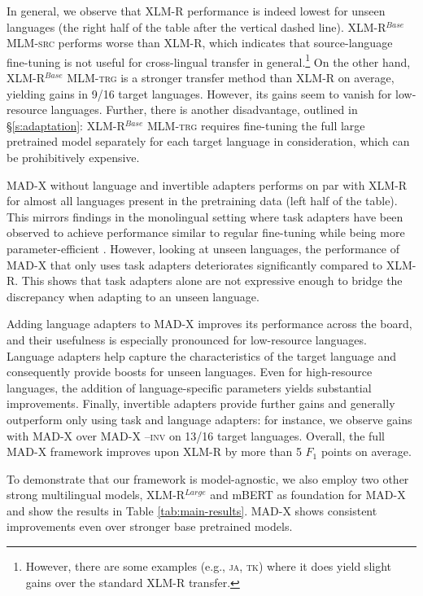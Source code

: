 \documentclass[11pt,a4paper]{article}
\newcommand{\model}[1]{\textsc{MAD-X}}
\newcommand{\xlmr}[1]{\textsc{XLM-R}}
\newcommand{\mlmsrc}[1]{\textsc{XLM-R$^{Base}$ MLM-src}}
\newcommand{\mlmtrg}[1]{\textsc{XLM-R$^{Base}$ MLM-trg}}
\begin{document}
In general, we observe that \xlmr{} performance is indeed lowest for unseen languages (the right half of the table after the vertical dashed line). \mlmsrc{} performs worse than \xlmr{}, which indicates that source-language fine-tuning is not useful for cross-lingual transfer in general.\footnote{However, there are some examples (e.g., \textsc{ja}, \textsc{tk}) where it does yield slight gains over the standard \xlmr{} transfer.} On the other hand, \mlmtrg{} is a stronger transfer method than \xlmr{} on average, yielding gains in 9/16 target languages. However, its gains seem to vanish for low-resource languages. Further, there is another disadvantage, outlined in \S\ref{s:adaptation}: \mlmtrg{} requires fine-tuning the full large pretrained model separately for each target language in consideration, which can be prohibitively expensive.

  

\model{} without language and invertible adapters performs on par with \xlmr{} for almost all languages present in the pretraining data (left half of the table). This mirrors findings in the monolingual setting where task adapters have been observed to achieve performance similar to regular fine-tuning while being more parameter-efficient \cite{Houlsby2019adapters}. However, looking at unseen languages, the performance of \model{} that only uses task adapters deteriorates significantly compared to \xlmr{}. This shows that task adapters alone are not expressive enough to bridge the discrepancy when adapting to an unseen language.

Adding language adapters to \model{} improves its performance across the board, and their usefulness is especially pronounced for low-resource languages. Language adapters help capture the characteristics of the target language and consequently provide boosts for unseen languages. Even for high-resource languages, the addition of language-specific parameters yields substantial improvements. Finally, invertible adapters provide further gains and generally outperform only using task and language adapters: for instance, we observe gains with \model{} over \model{} \textsc{--inv} on 13/16 target languages. Overall, the full \model{} framework improves upon \xlmr{} by more than 5 $F_1$ points on average.

To demonstrate that our framework is model-agnostic, we also employ two other strong multilingual models, XLM-R$^{Large}$ and mBERT as foundation for \model{} and show the results in Table \ref{tab:main-results}. \model{} shows consistent improvements even over stronger base pretrained models.
\end{document}
